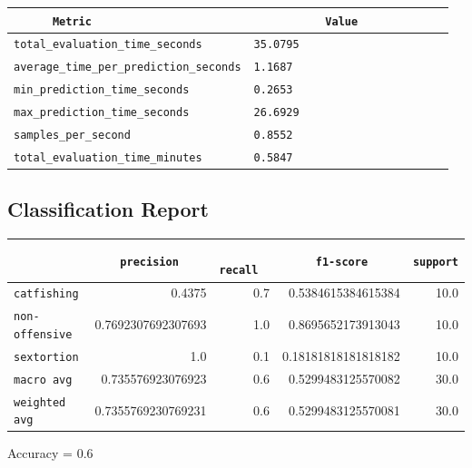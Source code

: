 \documentclass{article}
\begin{document}
\begin{center}
\begin{tabular}{l | l} \hline
    \verb|      Metric     | & \verb|           Value           | \\ \hline
    \hline
    \verb|total_evaluation_time_seconds| & \verb|35.0795                      | \\ \hline
    \verb|average_time_per_prediction_seconds| & \verb|1.1687                       | \\ \hline
    \verb|min_prediction_time_seconds| & \verb|0.2653                       | \\ \hline
    \verb|max_prediction_time_seconds| & \verb|26.6929                      | \\ \hline
    \verb|samples_per_second| & \verb|0.8552                       | \\ \hline
    \verb|total_evaluation_time_minutes| & \verb|0.5847                       | \\ \hline
\end{tabular}
\end{center}

\subsection{Classification Report}

\begin{center}
\begin{tabular}{l | r | r | r | r} \hline
    \verb|            | & \verb|    precision     | & \verb|      recall      | & \verb|     f1-score     | & \verb|support| \\ \hline
    \hline
    \verb|catfishing | & 0.4375 & 0.7 & 0.5384615384615384 &    10.0 \\ \hline
    \verb|non-offensive| & 0.7692307692307693 & 1.0 & 0.8695652173913043 &    10.0 \\ \hline
    \verb|sextortion | & 1.0 & 0.1 & 0.18181818181818182 &    10.0 \\ \hline
    \verb|macro avg  | & 0.735576923076923 & 0.6 & 0.5299483125570082 &    30.0 \\ \hline
    \verb|weighted avg| & 0.7355769230769231 & 0.6 & 0.5299483125570081 &    30.0 \\ \hline
\end{tabular}
\end{center}

\begin{center}
Accuracy = 0.6
\end{center}
\end{document}
